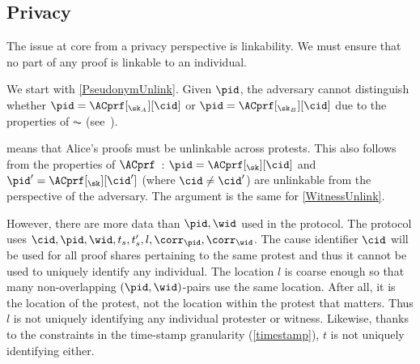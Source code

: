 \subsection{Privacy}

The issue at core from a privacy perspective is linkability.
We must ensure that no part of any proof is linkable to an individual.

We start with \cref{PseudonymUnlink}.
Given \(\pid\), the adversary cannot distinguish whether \(\pid = 
  \ACprf[_{\sk_A}][\cid]\) or \(\pid = \ACprf[_{\sk_B}][\cid]\) due to the 
properties of \(\AC\) (see~\cite{HowToWinTheCloneWars}).

 means that Alice's proofs must be unlinkable across 
protests.
This also follows from the properties of 
\(\ACprf\)~\cite{HowToWinTheCloneWars}: \(\pid =  \ACprf[_{\sk}][\cid]\) and 
\(\pid' = \ACprf[_{\sk}][\cid']\) (where \(\cid \neq \cid'\)) are unlinkable 
from the perspective of the adversary.
The argument is the same for \cref{WitnessUnlink}.

However, there are more data than \(\pid, \wid\) used in the protocol.
The protocol uses \(\cid, \pid, \wid, t_s, t_s', l, \corr_{\pid}, 
\corr_{\wid}\).
The cause identifier \(\cid\) will be used for all proof shares
pertaining to the same protest and thus it cannot be used to uniquely
identify any individual. The location \(l\) is coarse enough so that many non-overlapping 
\((\pid, \wid)\)-pairs use the same location.
After all, it is the location of the protest, not the location within the 
protest that matters.
Thus \(l\) is not uniquely identifying any individual protester or witness.
Likewise, thanks to the constraints in the time-stamp granularity 
(\cref{timestamp}), \(t\) is not uniquely identifying either.

